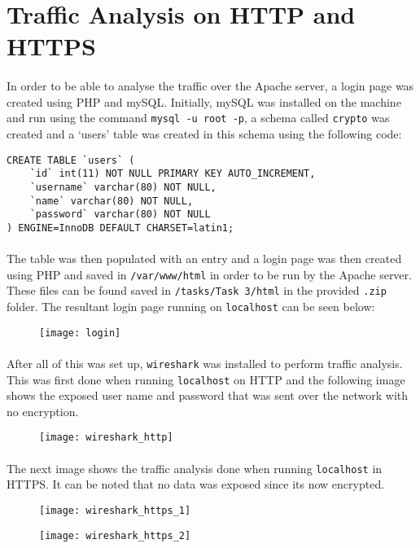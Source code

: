 \section{Traffic Analysis on HTTP and HTTPS} 
\paragraph{ }In order to be able to analyse the traffic over the Apache server, a login page was created using PHP and mySQL. Initially, mySQL was installed on the machine and run using the command \texttt{mysql -u root -p}, a schema called \texttt{crypto} was created and a `users' table was created in this schema using the following code:

\begin{verbatim}
CREATE TABLE `users` (
    `id` int(11) NOT NULL PRIMARY KEY AUTO_INCREMENT,
    `username` varchar(80) NOT NULL,
    `name` varchar(80) NOT NULL,
    `password` varchar(80) NOT NULL
) ENGINE=InnoDB DEFAULT CHARSET=latin1;
\end{verbatim}

\paragraph{ }The table was then populated with an entry and a login page was then created using PHP and saved in \texttt{/var/www/html} in order to be run by the Apache server. These files can be found saved in \texttt{/tasks/Task 3/html} in the provided \texttt{.zip} folder. The resultant login page running on \texttt{localhost} can be seen below:

\begin{figure}[!h]
	\centering
	\texttt{[image: login]}
\end{figure}

\paragraph{ }After all of this was set up, \texttt{wireshark} was installed to perform traffic analysis. This was first done when running \texttt{localhost} on HTTP and the following image shows the exposed user name and password that was sent over the network with no encryption.

\begin{figure}[H]
	\centering
	\texttt{[image: wireshark\_http]}
\end{figure}

\paragraph{ }The next image shows the traffic analysis done when running \texttt{localhost} in HTTPS. It can be noted that no data was exposed since its now encrypted.

\begin{figure}[H]
	\centering
	\texttt{[image: wireshark\_https\_1]}
\end{figure}

\begin{figure}[H]
	\centering
	\texttt{[image: wireshark\_https\_2]}
\end{figure}